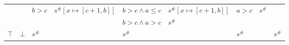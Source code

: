 \documentclass{beamer}
\begin{document}
\begin{frame}
\begin{table}[]
{\begin{tabular}{|l|l|ll|ll|ll|l|}
                                        &                         & \multirow{2}{*}{$b > c$} & \multirow{2}{*}{$s^\#[x \mapsto [c + 1, b]]$} & $b > c \land a \le c$ & $s^\#[x \mapsto [c + 1, b]]$ & \multirow{2}{*}{$a > c$} & \multirow{2}{*}{$s^\#$}        &                                                 \\
                                        &                         &                          &                                               & $b > c \land a > c$   & $s^\#$                   &                          &                                &                                                 \\ \hline
        $\top$                          & $\bot$                  & \multicolumn{2}{l|}{$s^\#$}                                              & \multicolumn{2}{l|}{$s^\#$}                      & \multicolumn{2}{l|}{$s^\#$}                               & $s^\#$                                          \\ \hline
        \end{tabular}}
        \end{table}
    \end{frame}
    
\end{document}
